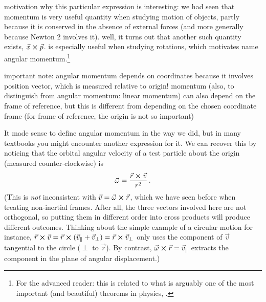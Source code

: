 \documentclass[../class_mech_main.tex]{subfiles}
\begin{document}
motivation why this particular expression is interesting: we had seen that momentum is very useful quantity when studying motion of objects, partly because it is conserved in the absence of external forces (and more generally because Newton 2 involves it). well, it turns out that another such quantity exists, $\vec{x} \cross \vec{p}$. is especially useful when studying rotations, which motivates name angular momentum.\footnote{For the advanced reader: this is related to what is arguably one of the most important (and beautiful) theorems in physics, .}

important note: angular momentum depends on coordinates because it involves position vector, which is measured relative to origin! momentum (also, to distinguish from angular momentum: linear momentum) can also depend on the frame of reference, but this is different from depending on the chosen coordinate frame (for frame of reference, the origin is not so important)


It made sense to define angular momentum in the way we did, but in many textbooks you might encounter another expression for it. We can recover this by noticing that the orbital angular velocity of a test particle about the origin (measured counter-clockwise) is
\begin{equation}
	\vec{\omega} = \frac{\vec{r} \cross \vec{v}}{r^2} \, .
\end{equation}
(This is \emph{not} inconsistent with $\vec{v} = \vec{\omega} \cross \vec{r}$, which we have seen before when treating non-inertial frames. After all, the three vectors involved here are not orthogonal, so putting them in different order into cross products will produce different outcomes. Thinking about the simple example of a circular motion for instance, $\vec{r} \cross \vec{v} = \vec{r} \cross (\vec{v}_\parallel + \vec{v}_\perp) = \vec{r} \cross \vec{v}_\perp$ only uses the component of $\vec{v}$ tangential to the circle ($\perp$ to $\vec{r}$). By contrast, $\vec{\omega} \cross \vec{r} = \vec{v}_\parallel$ extracts the component in the plane of angular displacement.)
\end{document}
